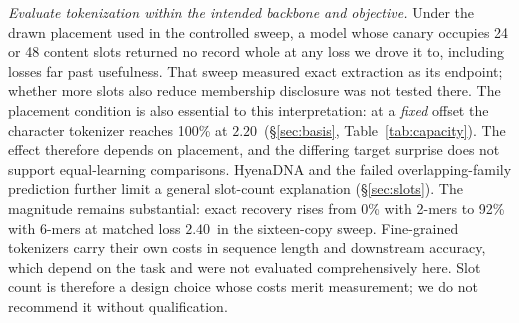 \emph{Evaluate tokenization within the intended backbone and objective.} Under the drawn
placement used in the controlled sweep, a model whose canary occupies 24 or 48 content slots
returned no record whole at any loss we drove it to, including losses far past usefulness. That
sweep measured exact extraction as its endpoint; whether more slots also reduce membership
disclosure was not tested there. The placement condition is also essential to this interpretation: at a \emph{fixed} offset the character tokenizer reaches 100\% at $2.20$\,\bits{}
(\S\ref{sec:basis}, Table~\ref{tab:capacity}). The effect therefore depends on placement,
and the differing target surprise does not support equal-learning comparisons. HyenaDNA
and the failed overlapping-family prediction further limit a general slot-count explanation
(\S\ref{sec:slots}). The magnitude remains substantial: exact recovery rises from 0\% with 2-mers
to 92\% with 6-mers at matched loss $2.40$\,\bits{} in the sixteen-copy sweep. Fine-grained
tokenizers carry their own costs in sequence length and downstream accuracy, which depend on the task and were not evaluated comprehensively here. Slot count is therefore a
design choice whose costs merit measurement; we do not recommend it without qualification.
